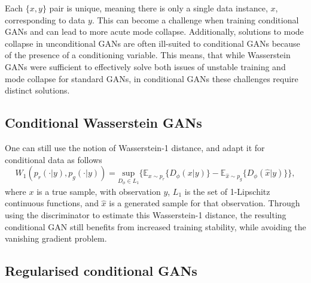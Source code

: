 \documentclass[fleqn,usenatbib]{mnras}
\begin{document}
Each $\{x, y\}$ pair is unique, meaning there is only a single data instance, $x$, corresponding to data $y$. This can become a challenge when training conditional GANs and can lead to more acute mode collapse. Additionally, solutions 
to mode collapse in unconditional GANs \citep{schonfeld2020u,karras2020training,zhao2021improved} are often ill-suited to conditional GANs 
because of the presence of a conditioning variable. This means, that while Wasserstein GANs were sufficient to effectively solve both issues of unstable training and mode collapse for standard GANs, in conditional GANs these challenges require distinct solutions.

\subsection{Conditional Wasserstein GANs}\label{subsec:conditional_wgan}

One can still use the notion of Wasserstein-1 distance, and adapt it for conditional data as follows
\begin{equation}
	W_1(p_r(\cdot | y), p_g(\cdot | y)) = \underset{D_\phi\in L_1}{\text{sup}}  \{ \mathbb{E}_{x \sim p_r} \{ D_\phi(x|y)\} -\mathbb{E}_{\hat{x} \sim p_g}\{ D_\phi(\hat{x}|y)\}\}, 
\end{equation}
where $x$ is a true sample, with observation $y$, $L_1$ is the set of 1-Lipschitz continuous functions, and $\hat{x}$ is a generated sample for that observation. Through using the discriminator to estimate this Wasserstein-1 distance, the resulting conditional GAN still benefits from increased training stability, while avoiding the vanishing gradient problem.

\subsection{Regularised conditional GANs}\label{subsec:regularised_cgan}
\end{document}

